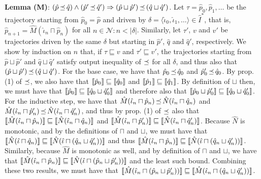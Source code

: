 \textbf{Lemma (M)}: $(\hat p \operatorname{\mathrel{\preceq}} \hat q) \wedge (\hat p' \operatorname{\mathrel{\preceq}} \hat q') \Rightarrow (\hat p \sqcup \hat p') \operatorname{\mathrel{\preceq}} \, (\hat q \sqcup \hat q')$. Let $\tau = \hat p_{0}, \hat p_{1}, \ldots$ be the trajectory starting from $\hat p_{0} = \hat p$ and driven by $\delta = \langle \hat \iota_{0}, \hat \iota_{1}, \ldots \rangle \in \hat I^{*}$, that is, $\hat p_{n+1} = \hat M(\hat \iota_{n} \sqcap \hat p_{n})$ for all $n \in \mathcal{N} : n < | \delta |$. Similarly, let $\tau'$, $v$ and $v'$ be trajectories driven by the same $\delta$ but starting in $\hat p'$, $\hat q$ and $\hat q'$, respectively. We show by induction on $n$ that, if $\tau \sqsubseteq v$ and $\tau' \sqsubseteq v'$, the trajectories starting from $\hat p \sqcup \hat p'$ and $\hat q \sqcup \hat q'$ satisfy output inequality of $\operatorname{\mathrel{\preceq}}$ for all $\delta$, and thus also that $(\hat p \sqcup \hat p') \operatorname{\mathrel{\preceq}} \, (\hat q \sqcup \hat q')$. For the base case, we have that $\hat p_{0} \operatorname{\mathrel{\preceq}} \hat q_{0}$ and $\hat p_{0}' \operatorname{\mathrel{\preceq}} \hat q_{0}$. By prop. (1) of $\operatorname{\mathrel{\preceq}}$, we also have that $\llbracket\hat p_{0}\rrbracket \sqsubseteq \llbracket\hat q_{0}\rrbracket$ and $\llbracket\hat p_{1}\rrbracket \sqsubseteq \llbracket\hat q_{1}\rrbracket$. By definition of $\sqcup$ then, we must have that $\llbracket\hat p_{0}\rrbracket \sqsubseteq \llbracket\hat q_{0} \sqcup \hat q_{0}'\rrbracket$ and therefore also that $\llbracket\hat p_{0} \sqcup \hat p_{0}'\rrbracket \sqsubseteq \llbracket\hat q_{0} \sqcup \hat q_{0}'\rrbracket$. For the inductive step, we have that $\hat M(\hat \iota_{n} \sqcap \hat p_{n}) \operatorname{\mathrel{\preceq}} \hat N(\hat \iota_{n} \sqcap \hat q_{n})$ and $\hat M(\hat \iota_{n} \sqcap \hat p_{n}') \operatorname{\mathrel{\preceq}} \hat N(\hat \iota_{n} \sqcap \hat q_{n}')$, and thus by prop. (1) of $\operatorname{\mathrel{\preceq}}$ also that $\llbracket\hat M(\hat \iota_{n} \sqcap \hat p_{n})\rrbracket \sqsubseteq \llbracket\hat N(\hat \iota_{n} \sqcap \hat q_{n})\rrbracket$ and $\llbracket\hat M(\hat \iota_{n} \sqcap \hat p_{n}')\rrbracket \sqsubseteq \llbracket\hat N(\hat \iota_{n} \sqcap \hat q_{n}')\rrbracket$. Because $\hat N$ is monotonic, and by the definitions of $\sqcap$ and $\sqcup$, we must have that $\llbracket\hat N(\hat \iota \sqcap \hat q_{n})\rrbracket \sqsubseteq \llbracket\hat N(\hat \iota \sqcap (\hat q_{n} \sqcup \hat q_{n}'))\rrbracket$ and thus $\llbracket\hat M(\hat \iota_{n} \sqcap \hat p_{n})\rrbracket \sqsubseteq \llbracket\hat N(\hat \iota \sqcap (\hat q_{n} \sqcup \hat q_{n}'))\rrbracket$. Similarly, because $\hat M$ is monotonic as well, and by definition of $\sqcap$ and $\sqcup$, we have that $\llbracket\hat M(\hat \iota_{n} \sqcap \hat p_{n})\rrbracket \sqsubseteq \llbracket\hat N(\hat \iota \sqcap (\hat p_{n} \sqcup \hat p_{n}'))\rrbracket$ and the least such bound. Combining these two results, we must have that $\llbracket\hat M(\hat \iota_{n} \sqcap (\hat p_{n} \sqcup \hat p_{n}'))\rrbracket \sqsubseteq \llbracket\hat M(\hat \iota_{n} \sqcap (\hat q_{n} \sqcup \hat q_{n}'))\rrbracket$.

